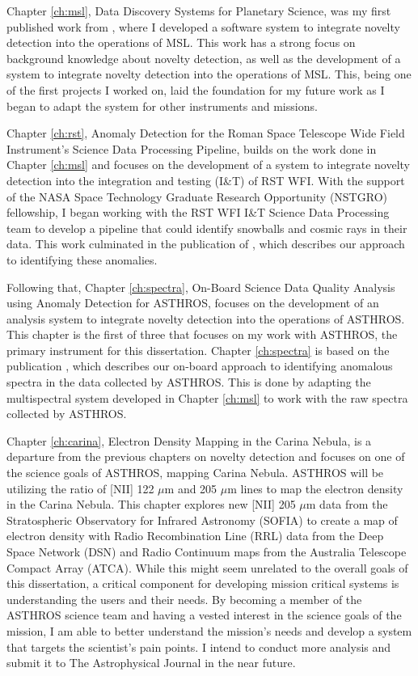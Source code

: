 Chapter \ref{ch:msl}, Data Discovery Systems for Planetary Science,  was my first published work from \cite{horton2021integrating}, where I developed a software system to integrate novelty detection into the operations of MSL.
This work has a strong focus on background knowledge about novelty detection, as well as the development of a system to integrate novelty detection into the operations of MSL.
This, being one of the first projects I worked on, laid the foundation for my future work as I began to adapt the system for other instruments and missions.

Chapter \ref{ch:rst}, Anomaly Detection for the Roman Space Telescope Wide Field Instrument's Science Data Processing Pipeline, builds on the work done in Chapter \ref{ch:msl} and focuses on the development of a system to integrate novelty detection into the integration and testing (I\&T) of RST WFI.
With the support of the NASA Space Technology Graduate Research Opportunity (NSTGRO) fellowship, I began working with the RST WFI I\&T Science Data Processing team to develop a pipeline that could identify snowballs and cosmic rays in their data. 
This work culminated in the publication of \cite{horton2024anomaly}, which describes our approach to identifying these anomalies. 

Following that, Chapter \ref{ch:spectra}, On-Board Science Data Quality Analysis using Anomaly Detection for ASTHROS, focuses on the development of an analysis system to integrate novelty detection into the operations of ASTHROS.
This chapter is the first of three that focuses on my work with ASTHROS, the primary instrument for this dissertation.
Chapter \ref{ch:spectra} is based on the publication \cite{horton2024board}, which describes our on-board approach to identifying anomalous spectra in the data collected by ASTHROS.
This is done by adapting the multispectral system developed in Chapter \ref{ch:msl} to work with the raw spectra collected by ASTHROS.

Chapter \ref{ch:carina}, Electron Density Mapping in the Carina Nebula, is a departure from the previous chapters on novelty detection and focuses on one of the science goals of ASTHROS, mapping Carina Nebula.
ASTHROS will be utilizing the ratio of [NII] 122 $\mu$m and 205 $\mu$m lines to map the electron density in the Carina Nebula.
This chapter explores new [NII] 205 $\mu$m data from the Stratospheric Observatory for Infrared Astronomy (SOFIA) to create a map of electron density with Radio Recombination Line (RRL) data from the Deep Space Network (DSN) and Radio Continuum maps from the Australia Telescope Compact Array (ATCA).
While this might seem unrelated to the overall goals of this dissertation, a critical component for developing mission critical systems is understanding the users and their needs.
By becoming a member of the ASTHROS science team and having a vested interest in the science goals of the mission, I am able to better understand the mission's needs and develop a system that targets the scientist's pain points.
I intend to conduct more analysis and submit it to The Astrophysical Journal in the near future.

